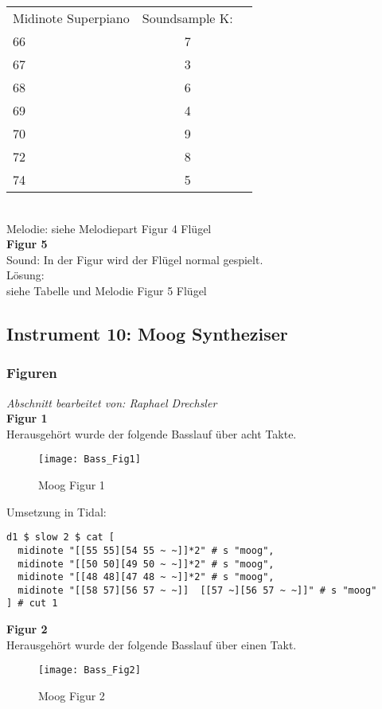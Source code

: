 \documentclass[
10pt, %
a4paper, %
oneside, %
headinclude,footinclude, %
BCOR5mm, %
]{scrartcl}
\begin{document}
\begin{tabular}{lcr}
Midinote Superpiano & Soundsample K: \\ 
66&7\\
67&3\\
68&6\\
69&4\\
70&9\\
72&8\\
74&5\\
\end{tabular}\\

\noindent Melodie: siehe Melodiepart Figur 4 Flügel\\

\noindent \textbf{Figur 5}\\
Sound: In der Figur wird der Flügel normal gespielt.\\
Lösung:\\
siehe Tabelle und Melodie Figur 5 Flügel

\subsection{Instrument 10: Moog Syntheziser}
\subsubsection{Figuren}
\textit{Abschnitt bearbeitet von: Raphael Drechsler}\\

\noindent\textbf{Figur 1}\\
Herausgehört wurde der folgende Basslauf über acht Takte.\\
\begin{figure}[h]
	\centering 
	\texttt{[image: Bass\_Fig1]} 
	\caption{Moog Figur 1}
\end{figure}

\noindent Umsetzung in Tidal:
\begin{lstlisting}
d1 $ slow 2 $ cat [
  midinote "[[55 55][54 55 ~ ~]]*2" # s "moog",
  midinote "[[50 50][49 50 ~ ~]]*2" # s "moog",
  midinote "[[48 48][47 48 ~ ~]]*2" # s "moog",
  midinote "[[58 57][56 57 ~ ~]]  [[57 ~][56 57 ~ ~]]" # s "moog" 
] # cut 1
\end{lstlisting}

\noindent\textbf{Figur 2}\\
Herausgehört wurde der folgende Basslauf über einen Takt.
\begin{figure}[h]
	\centering 
	\texttt{[image: Bass\_Fig2]} 
	\caption{Moog Figur 2}
\end{figure}
\end{document}
